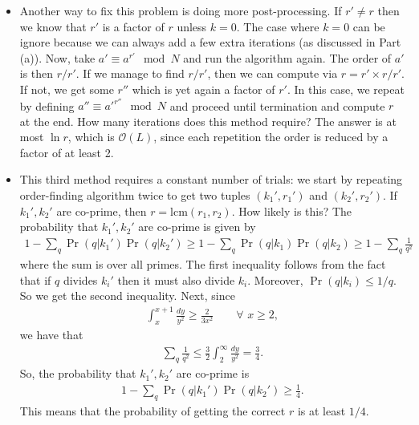 \documentclass{article}
\theoremstyle{definition}
\newcommand{\f}[2]{\frac{#1}{#2}}
\begin{document}
\begin{enumerate}[label=(\alph*)]
\begin{itemize}
	\item Another way to fix this problem is doing more post-processing. If $r' \neq r$ then we know that $r'$ is a factor of $r$ unless $k=0$. The case where $k=0$ can be ignore because we can always add a few extra iterations (as discussed in Part (a)).  Now, take $a' \equiv a^{r'} \mod N$ and run the algorithm again. The order of $a'$ is then $r/r'$. If we manage to find $r/r'$, then we can compute via $r = r' \times r/r'$. If not, we get some $r''$ which is yet again a factor of $r'$. In this case, we repeat by defining $a'' \equiv a'^{r''}\mod N$ and proceed until termination and compute $r$ at the end. How many iterations does this method require? The answer is at most $\ln r$, which is $\boxed{\mathcal{O}(L)}$, since each repetition the order is reduced by a factor of at least 2. 
	
	\item This third method requires a constant number of trials: we start by repeating order-finding algorithm twice to get two tuples $(k_1',r_1')$ and $(k_2',r_2')$. If $k_1', k_2'$ are co-prime, then $r = \text{lcm}(r_1,r_2)$. How likely is this? The probability that $k_1',k_2'$ are co-prime is given by 
	\begin{align*}
		1- \sum_q \Pr(q|k_1') \Pr(q| k_2') \geq 1- \sum_q \Pr(q|k_1) \Pr(q| k_2) \geq 1 - \sum_q \f{1}{q^2} 
	\end{align*}
	where the sum is over all primes.  The first inequality follows from the fact that if $q$ divides $k_i'$ then it must also divide $k_i$. Moreover, $\Pr(q|k_i) \leq 1/q$. So we get the second inequality. Next, since
	\begin{align*}
		\int_{x}^{x+1} \f{dy}{y^2} \geq \f{2}{3x^2} \quad\quad \forall \,\, x \geq 2,
	\end{align*}
	we have that
	\begin{align*}
		\sum_q \f{1}{q^2} \leq \f{3}{2}\int_2^\infty \f{dy}{y^2} = \f{3}{4}.
	\end{align*}
	So, the probability that $k_1', k_2'$ are co-prime is 
	\begin{align*}
			1- \sum_q \Pr(q|k_1') \Pr(q| k_2') \geq \f{1}{4}. 
	\end{align*}
	This means that the probability of getting the correct $r$ is at least $1/4$. 
\end{itemize}

\end{enumerate}



\newpage
\end{document}
